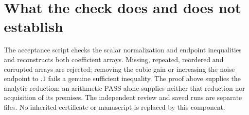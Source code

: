 \documentclass[11pt]{article}
\begin{document}
\section{What the check does and does not establish}
The acceptance script checks the scalar normalization and endpoint
inequalities and reconstructs both coefficient arrays. Missing, repeated,
reordered and corrupted arrays are rejected; removing the cubic gain
or increasing the noise endpoint to $.1$ fails a genuine sufficient
inequality. The proof above supplies the analytic reduction; an arithmetic
PASS alone supplies neither that reduction nor acquisition of its premises.
The independent review and saved runs are separate files. No inherited
certificate or manuscript is replaced by this component.
\end{document}
